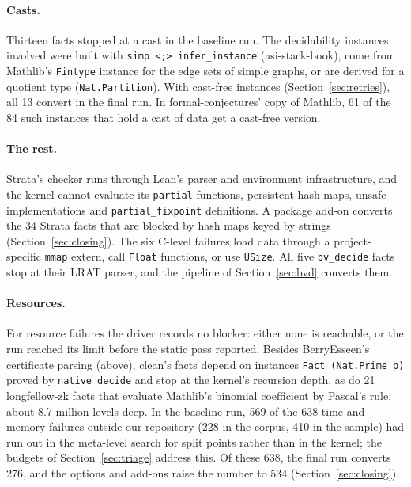 \documentclass[11pt]{article}
\begin{document}
\paragraph{Casts.} Thirteen facts stopped at a cast in the baseline run. The decidability instances involved
were built with \verb|simp <;> infer_instance| (asi-stack-book), come from Mathlib's \texttt{Fintype}
instance for the edge sets of simple graphs, or are derived for a quotient type
(\texttt{Nat.Partition}). With cast-free instances (Section~\ref{sec:retries}), all 13 convert in the final
run. In formal-conjectures' copy of Mathlib, 61 of the 84 such instances that hold a cast of data get a
cast-free version.

\paragraph{The rest.} Strata's checker runs through Lean's parser and environment infrastructure, and the
kernel cannot evaluate its \texttt{partial} functions, persistent hash maps, unsafe implementations and
\texttt{partial\_fixpoint} definitions. A package add-on converts the 34 Strata facts that are blocked by hash
maps keyed by strings (Section~\ref{sec:closing}). The six C-level failures load data through a project-specific
\texttt{mmap} extern, call \texttt{Float} functions, or use \texttt{USize}. All five \texttt{bv\_decide}
facts stop at their LRAT parser, and the pipeline of Section~\ref{sec:bvd} converts them.

\paragraph{Resources.} For resource failures the driver records no blocker: either none is reachable, or the
run reached its limit before the static pass reported. Besides BerryEsseen's certificate parsing (above),
clean's facts depend on instances \verb|Fact (Nat.Prime p)| proved by \texttt{native\_decide} and stop at the
kernel's recursion depth, as do 21 longfellow-zk facts that evaluate Mathlib's binomial coefficient by Pascal's
rule, about 8.7 million levels deep. In the baseline run, 569 of the 638 time and memory failures outside our
repository (228 in the corpus, 410 in the sample) had run out in the meta-level search for split points rather
than in the kernel; the budgets of Section~\ref{sec:triage} address this. Of these 638, the final run converts
276, and the options and add-ons raise the number to 534 (Section~\ref{sec:closing}).
\end{document}
